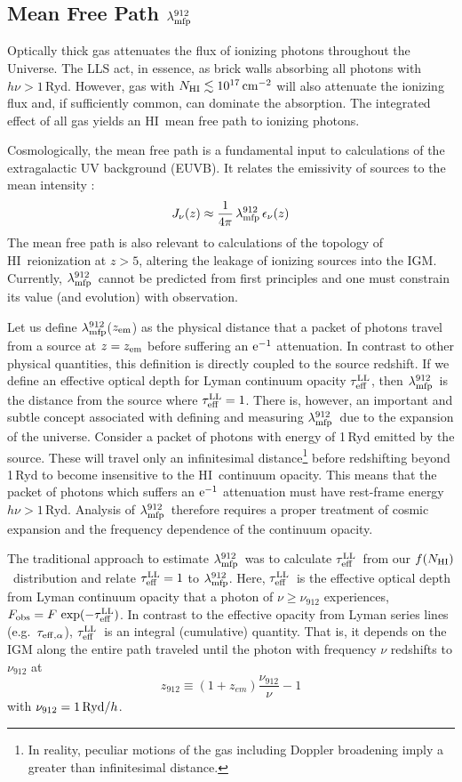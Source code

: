 \documentclass[graybox]{svmult}
\newcommand{\HI}{H{\sc I}}
\newcommand{\mnhi}{N_{\rm HI}}
\def\cm#1{\, {\rm cm^{#1}}}
\def\mfnhi{f(\mnhi)}
\def\fnhi{$\mfnhi$}
\def\mlmfp{\lambda_{\rm mfp}^{912}}
\def\lmfp{$\mlmfp$}
\def\mtll{\tau_{\rm eff}^{\rm LL}}
\def\tll{$\mtll$}
\begin{document}
\subsection{Mean Free Path \lmfp}
\label{sec:MFP}

Optically thick gas attenuates the flux of ionizing
photons throughout the Universe.  The LLS act, in essence,
as brick walls absorbing all photons with $h \nu > 1$\,Ryd.
However, gas with $\mnhi \lesssim 10^{17} \cm{-2}$ will
also attenuate the ionizing flux and, if sufficiently common,
can dominate the absorption.
The integrated effect of all gas yields an \HI\ mean
free path to ionizing photons.  

Cosmologically, the mean free path is a fundamental
input to calculations of the extragalactic UV background (EUVB).
It relates the emissivity of sources to the mean intensity
\cite[]{hm96,flz+09}:
\begin{equation}
J_\nu(z) \approx \frac{1}{4 \pi} \, \mlmfp \, \epsilon_\nu(z)
\end{equation}
The mean free path is also relevant to calculations of the topology
of \HI\ reionization at $z>5$, altering the leakage
of ionizing sources into the IGM.
Currently, \lmfp\
cannot be predicted from first principles
and one must constrain its value (and evolution)
with observation.

Let us define
\lmfp($z_{\rm em}$) as the physical distance that
a packet of photons travel from a source at $z=z_{\rm em}$
before suffering an $\rm e^{-1}$ attenuation.
In contrast to other physical quantities,
this definition is directly coupled to the source redshift.
If we define an effective optical depth for Lyman
continuum opacity \tll, then \lmfp\ is the distance from
the source where $\mtll = 1$.
There is, however, an important and subtle concept associated
with defining and measuring \lmfp\ due to the expansion of the
universe.  Consider a packet of photons with energy of 1\,Ryd
emitted by the source.
These will travel only an infinitesimal distance\footnote{In
reality, peculiar motions of the gas including Doppler broadening
imply a greater than infinitesimal distance.} 
before
redshifting beyond 1\,Ryd to become insensitive to the
\HI\ continuum opacity.  This means that the packet of photons
which suffers an $\rm e^{-1}$ attenuation must have rest-frame
energy $h\nu > 1$\,Ryd.  
Analysis of \lmfp\ therefore requires a proper treatment of
cosmic expansion and
the frequency dependence of the continuum opacity.

The traditional approach to estimate \lmfp\
was to calculate \tll\ from our 
\fnhi\ distribution and relate $\mtll=1$ to \lmfp.
Here, \tll\ is the effective optical depth from Lyman continuum opacity
that a photon of $\nu \ge \nu_{912}$ experiences, 
$F_{\rm obs} = F \, \exp(-\mtll)$.
In contrast to the effective opacity from Lyman series lines
(e.g.\ $\tau_{\rm eff,\alpha}$), \tll\ is
an integral (cumulative) quantity.
That is, it depends on the IGM along the entire path traveled
until the photon with frequency $\nu$
redshifts to $\nu_{912}$ at 
\begin{equation}
z_{912} \equiv (1+z_{em}) \frac{\nu_{912}}{\nu}  - 1
\label{eqn:z912}
\end{equation}
with $\nu_{912} = {\rm 1\,Ryd}/h$.
\end{document}
